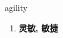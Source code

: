 
\begin{frame}
{\huge agility}
\begin{center}
\begin{enumerate}\Large
  \item \textbf{灵敏, 敏捷}
\end{enumerate}
\end{center}
\end{frame}
